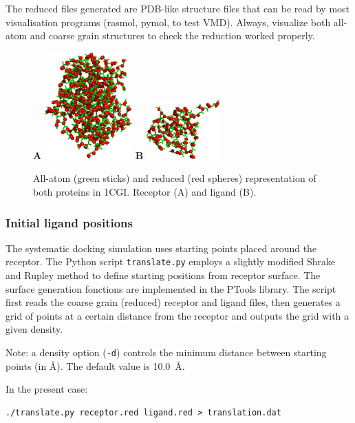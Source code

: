 \documentclass[12pt,a4paper]{article}
\begin{document}
The reduced files generated are PDB-like structure files that can be read by most visualisation
programs (rasmol, pymol, to test VMD). 
Always, visualize both all-atom and coarse grain structures to check the reduction worked properly.

\begin{figure}[htbp]
\center
{\textbf A}
\includegraphics*[width=0.30\textwidth]{img/1CGI_receptor.png}
\hspace*{2cm}
{\textbf B}
\includegraphics*[width=0.25\textwidth]{img/1CGI_ligand.png}
\caption{All-atom (green sticks) and reduced (red spheres) representation of both proteins in 1CGI. Receptor (A) and ligand (B).}
\end{figure}

\subsubsection{Initial ligand positions}

The systematic docking simulation uses starting points placed around the
receptor.  The Python script {\tt translate.py} employs a slightly modified
Shrake and Rupley \cite{shrake1973} method to define starting positions
from receptor surface.  The surface generation fonctions are implemented in
the PTools library. The script first reads the coarse grain (reduced)
receptor and ligand files, then generates a grid of points at a certain
distance from the receptor and outputs the grid with a given density.

Note: a density option ({\tt -d}) controls the minimum distance between starting
points (in \AA). The default value is 10.0~\AA. 

In the present case:
\begin{verbatim}
./translate.py receptor.red ligand.red > translation.dat
\end{verbatim}
\end{document}
